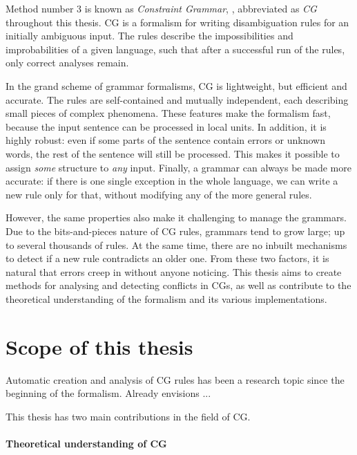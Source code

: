 Method number 3 is known as \emph{Constraint Grammar}, \cite{karlsson1995constraint}, abbreviated as \emph{CG} throughout this thesis. 
CG is a formalism for writing disambiguation rules for an initially ambiguous input. The rules describe the impossibilities and improbabilities of a given language, such that after a successful run of the rules, only correct analyses remain.

In the grand scheme of grammar formalisms, CG is lightweight, but efficient and accurate. The rules are self-contained and mutually independent, each describing small pieces of complex phenomena. %
These features make the formalism fast, because the input sentence can be processed in local units. In addition, it is highly robust: even if some parts of the sentence contain errors or unknown words, the rest of the sentence will still be processed.
This makes it possible to assign \emph{some} structure to \emph{any} input.
Finally, a grammar can always be made more accurate: if there is one single exception in the whole language, we can write a new rule only for that, without modifying any of the more general rules.

However, the same properties also make it challenging to manage the grammars.
Due to the bits-and-pieces nature of CG rules, grammars tend to grow large;
up to several thousands of rules. At the same time, there are no inbuilt 
mechanisms to detect if a new rule contradicts an older one.
From these two factors, it is natural that errors creep in without anyone noticing.
This thesis aims to create methods for analysing and detecting conflicts in CGs, as well as contribute to the theoretical understanding of the formalism and its various implementations.


\section{Scope of this thesis}

Automatic creation and analysis of CG rules has been a research topic since the beginning of the formalism. Already \cite{karlsson1995constraint} envisions ...

This thesis has two main contributions in the field of CG.

\paragraph{Theoretical understanding of CG}

